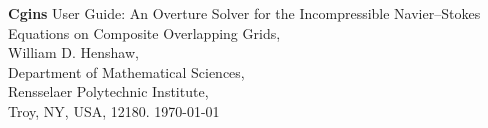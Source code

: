 \documentclass{article}
\begin{document}


\def\ud     {{    U}}
\def\pd     {{    P}}

\newcommand{\mbar}{\bar{m}}
\newcommand{\Rbar}{\bar{R}}
\newcommand{\Ru}{R_u}         %
\newcommand{\Div}{\grad\cdot}
\newcommand{\tauv}{\boldsymbol{\tau}}
\newcommand{\sumi}{\sum_{i=1}^n}
\newcommand{\dt}{{\Delta t}}

\baselineskip
\begin{flushleft}
{\Large
{\bf Cgins} User Guide: An Overture Solver for the Incompressible Navier--Stokes Equations on Composite Overlapping Grids, \\
}
\vspace{2\baselineskip}
William D. Henshaw,\\
Department of Mathematical Sciences, \\
Rensselaer Polytechnic Institute, \\
Troy, NY, USA, 12180.
\vspace{\baselineskip}
\today\\

\vspace{4\baselineskip}


\end{flushleft}
\end{document}

